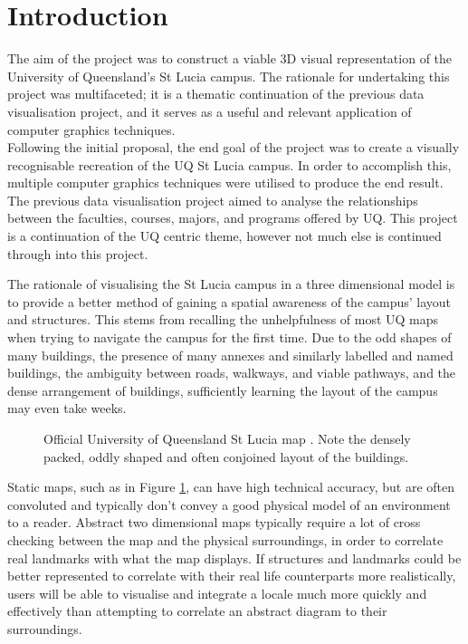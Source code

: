 \section{Introduction} %
\label{sec:introduction}
    The aim of the project was to construct a viable 3D visual representation of the University of Queensland's St Lucia campus.
    The rationale for undertaking this project was multifaceted; it is a thematic continuation of the previous data visualisation project, and it serves as a useful and relevant application of computer graphics techniques.\\

    Following the initial proposal, the end goal of the project was to create a visually recognisable recreation of the UQ St Lucia campus.
    In order to accomplish this, multiple computer graphics techniques were utilised to produce the end result.\\

    The previous data visualisation project aimed to analyse the relationships between the faculties, courses, majors, and programs offered by UQ.
    This project is a continuation of the UQ centric theme, however not much else is continued through into this project.

    The rationale of visualising the St Lucia campus in a three dimensional model is to provide a better method of gaining a spatial awareness of the campus' layout and structures.
    This stems from recalling the unhelpfulness of most UQ maps when trying to navigate the campus for the first time.
    Due to the odd shapes of many buildings, the presence of many annexes and similarly labelled and named buildings, the ambiguity between roads, walkways, and viable pathways, and the dense arrangement of buildings, sufficiently learning the layout of the campus may even take weeks.

    \begin{figure}[H]
        \centering
        \caption{
            Official University of Queensland St Lucia map \cite{uq_map}. Note the densely packed, oddly shaped and often conjoined layout of the buildings.
        }
        \label{fig:uq_flat_map}
    \end{figure}

    Static maps, such as in Figure \ref{fig:uq_flat_map}, can have high technical accuracy, but are often convoluted and typically don't convey a good physical model of an environment to a reader.
    Abstract two dimensional maps typically require a lot of cross checking between the map and the physical surroundings, in order to correlate real landmarks with what the map displays.
    If structures and landmarks could be better represented to correlate with their real life counterparts more realistically, users will be able to visualise and integrate a locale much more quickly and effectively than attempting to correlate an abstract diagram to their surroundings.


